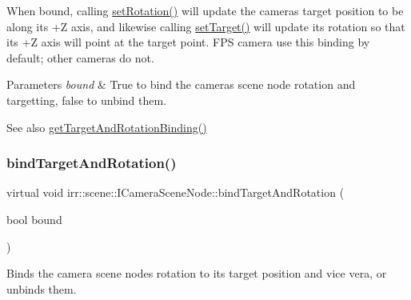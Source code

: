 When bound, calling \hyperlink{classirr_1_1scene_1_1ICameraSceneNode_af95d5f50c192f212e11f3f050e92a470}{set\+Rotation()} will update the camera\textquotesingle{}s target position to be along its +Z axis, and likewise calling \hyperlink{classirr_1_1scene_1_1ICameraSceneNode_a7280b07fd7915c64350db5a132b4ba07}{set\+Target()} will update its rotation so that its +Z axis will point at the target point. F\+PS camera use this binding by default; other cameras do not. 
\begin{DoxyParams}{Parameters}
{\em bound} & True to bind the camera\textquotesingle{}s scene node rotation and targetting, false to unbind them. \\
\hline
\end{DoxyParams}
\begin{DoxySeeAlso}{See also}
\hyperlink{classirr_1_1scene_1_1ICameraSceneNode_a343be24b2c43db7580127229db2dec6a}{get\+Target\+And\+Rotation\+Binding()} 
\end{DoxySeeAlso}
\mbox{\label{classirr_1_1scene_1_1ICameraSceneNode_ad8785d7b2f730933a8d4425ac54e7205}} 
\subsubsection{\texorpdfstring{bind\+Target\+And\+Rotation()}{bindTargetAndRotation()}\hspace{0.1cm}{\footnotesize\ttfamily [2/2]}}
{\footnotesize\ttfamily virtual void irr\+::scene\+::\+I\+Camera\+Scene\+Node\+::bind\+Target\+And\+Rotation (\begin{DoxyParamCaption}\item[{bool}]{bound }\end{DoxyParamCaption})\hspace{0.3cm}{\ttfamily [pure virtual]}}



Binds the camera scene node\textquotesingle{}s rotation to its target position and vice vera, or unbinds them. 

